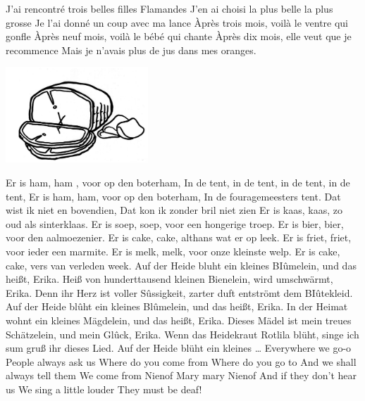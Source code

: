\documentclass{article}
\begin{document}
\begin{songs}{}
\endverse
\beginverse*
J’ai rencontré trois belles filles Flamandes
J’en ai choisi la plus belle la plus grosse
Je l’ai donné un coup avec ma lance
Àprès trois mois, voilà le ventre qui gonfle
Àprès neuf mois, voilà le bébé qui chante
Àprès dix mois, elle veut que je recommence
Mais je n’avais plus de jus dans mes oranges. 
\endverse
\endsong
\begin{intersong}
    \includegraphics[width=0.4\textwidth]{ham}
\end{intersong}
\beginverse
Er is ham, ham , voor op den boterham,
In de tent, in de tent, in de tent, in de tent,
Er is ham, ham, voor op den boterham,
In de fouragemeesters tent. 
\endverse
\beginchorus
Dat wist ik niet en bovendien, 
Dat kon ik zonder bril niet zien   
\endchorus
\beginverse
Er is kaas, kaas, zo oud als sinterklaas.
\endverse
\beginverse
Er is soep, soep, voor een hongerige troep.
\endverse
\beginverse
Er is bier, bier, voor den aalmoezenier.
\endverse
\beginverse
Er is cake, cake, althans wat er op leek.
\endverse
\beginverse
Er is friet, friet, voor ieder een marmite. 
\endverse
\beginverse
Er is melk, melk, voor onze kleinste welp. 
\endverse
\beginverse
Er is cake, cake, vers van verleden week. 
\endverse
\endsong
{}
\beginverse*
Auf der Heide bluht ein kleines BIûmelein,
und das heißt, Erika.
Heiß von hunderttausend kleinen Bienelein,
wird umschwärmt, Erika.
Denn ihr Herz ist voller Sûssigkeit,
zarter duft entströmt dem BIûtekleid.
Auf der Heide blûht ein kleines Blûmelein,
und das heißt, Erika.
\endverse
\beginverse*
In der Heimat wohnt ein kleines Mägdelein,
und das heißt, Erika.
Dieses Mädel ist mein treues Schätzelein,
und mein Glûck, Erika.
Wenn das Heidekraut Rotlila blüht,
singe ich sum gruß ihr dieses Lied.
Auf der Heide blüht ein kleines …
\endverse
\endsong
{}
\beginchorus
Everywhere we go-o 
People always ask us 
Where do you come from 
Where do you go to 
And we shall always tell them 	
We come from Nienof 
Mary mary Nienof 
And if they don’t hear us 
We sing a little louder 	
\endchorus
\beginchorus
They must be deaf!
\endchorus

\end{songs}
\end{document}
